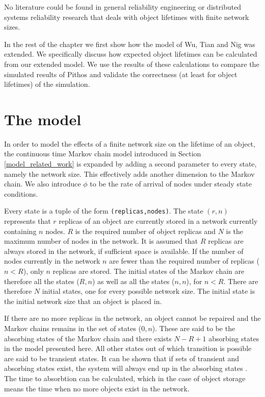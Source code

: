 No literature could be found in general reliability engineering or distributed systems reliability research that deals with object lifetimes with finite network sizes.

In the rest of the chapter we first show how the model of Wu, Tian and Nig was extended. We specifically discuss how expected object lifetimes can be calculated from our extended model. We use the results of these calculations to compare the simulated results of Pithos and validate the correctness (at least for object lifetimes) of the simulation.

\section{The model}
\label{model}

In order to model the effects of a finite network size on the lifetime of an object, the continuous time Markov chain model introduced in Section \ref{model_related_work} is expanded by adding a second parameter to every state, namely the network size. This effectively adds another dimension to the Markov chain. We also introduce $\phi$ to be the rate of arrival of nodes under steady state conditions.

Every state is a tuple of the form \verb.(replicas,nodes).. The state $(r, n)$ represents that $r$ replicas of an object are currently stored in a network currently containing $n$ nodes. $R$ is the required number of object replicas and $N$ is the maximum number of nodes in the network. It is assumed that $R$ replicas are always stored in the network, if sufficient space is available. If the number of nodes currently in the network $n$ are fewer than the required number of replicas ($n < R$), only $n$ replicas are stored. The initial states of the Markov chain are therefore all the states ($R,n$) as well as all the states ($n,n$), for $n < R$. There are therefore $N$ initial states, one for every possible network size. The initial state is the initial network size that an object is placed in.

If there are no more replicas in the network, an object cannot be repaired and the Markov chains remains in the set of states ($0,n$). These are said to be the absorbing states of the Markov chain and there exists $N - R + 1$ absorbing states in the model presented here. All other states out of which transition is possible are said to be transient states. It can be shown that if sets of transient and absorbing states exist, the system will always end up in the absorbing states \cite{grinstead1997introduction_probability}. The time to absorbtion can be calculated, which in the case of object storage means the time when no more objects exist in the network.

